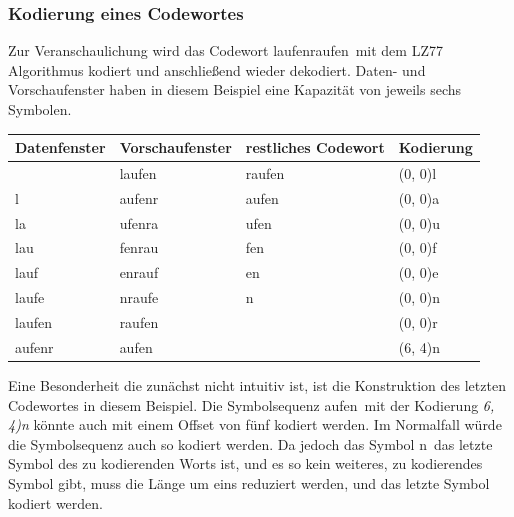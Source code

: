 \subsubsection{Kodierung eines Codewortes}
\label{subsubsec:kodierung_codewort}
Zur Veranschaulichung wird das Codewort \glqq laufenraufen\grqq\ mit dem LZ77 Algorithmus kodiert und anschließend wieder dekodiert.
Daten- und Vorschaufenster haben in diesem Beispiel eine Kapazität von jeweils sechs Symbolen.
\begin{table}[]
\centering
\begin{tabular}{|l|l|l|l|}
\hline
\textbf{Datenfenster} & \textbf{Vorschaufenster} & \textbf{restliches Codewort} & \textbf{Kodierung} \\ \hline
                      & laufen                   & raufen                       & (0, 0)l            \\ \hline
l                     & aufenr                   & aufen                        & (0, 0)a            \\ \hline
la                    & ufenra                   & ufen                         & (0, 0)u            \\ \hline
lau                   & fenrau                   & fen                          & (0, 0)f            \\ \hline
lauf                  & enrauf                   & en                           & (0, 0)e            \\ \hline
laufe                 & nraufe                   & n                            & (0, 0)n            \\ \hline
laufen                & raufen                   &                              & (0, 0)r            \\ \hline
aufenr                & aufen                    &                              & (6, 4)n            \\ \hline
\end{tabular}
\end{table}

Eine Besonderheit die zunächst nicht intuitiv ist, ist die Konstruktion des letzten Codewortes in diesem Beispiel.
Die Symbolsequenz \glqq aufen\grqq\ mit der Kodierung \textit{6, 4)n} könnte auch mit einem Offset von fünf kodiert werden.
Im Normalfall würde die Symbolsequenz auch so kodiert werden.
Da jedoch das Symbol \glqq n\grqq\ das letzte Symbol des zu kodierenden Worts ist, und es so kein weiteres, zu kodierendes Symbol gibt, muss die Länge um eins reduziert werden, und das letzte Symbol kodiert werden. \newline

